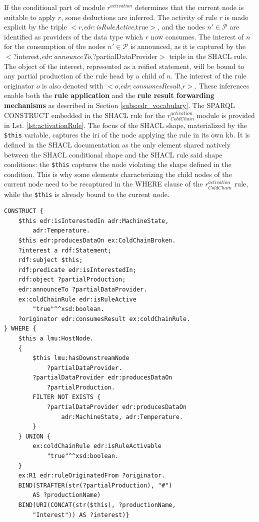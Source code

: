 \documentclass[sw]{iosart2x}
\newcommand{\namespace}[1]{\textit{#1$:$}}
\newcommand{\concept}[2]{\namespace{#1}\-\textit{#2}}
\newcommand{\triplet}[3]{$<$#1,\textit{#2},#3$>$}
\begin{document}
If the conditional part of module $r^{activation}$ determines that the current node is suitable to apply $r$, some deductions are inferred. 
The activity of rule $r$ is made explicit by the triple \triplet{$r$}{\concept{edr}{isRuleActive}}{true}, and the nodes $n'\in \mathcal{P}$ are identified as providers of the data type which $r$ now consumes. 
The interest of $n$ for the consumption of the nodes $n'\in \mathcal{P}$ is announced, as it is captured by the \triplet{?interest}{\concept{edr}{announce\-To}}{?partial\-Data\-Provider} triple in the SHACL rule.
The object of the interest, represented as a reified statement, will be bound to any partial production of the rule head by a child of $n$.
The interest of the rule originator $o$ is also denoted with \triplet{$o$}{\concept{edr}{consumes\-Result}}{$r$}.
These inferences enable both the \textbf{rule application} and the \textbf{rule result forwarding mechanisms} as described in Section \textsection \ref{subs:edr_vocabulary}.
The SPARQL CONSTRUCT embedded in the SHACL rule for the $r_{ColdChain}^{activation}$ module is provided in Lst. \ref{lst:activationRule}.
The focus of the SHACL shape, materialized by the \texttt{\$this} variable, captures the \gls{iri} of the node applying the rule in its own \gls{kb}.
It is defined in the SHACL documentation as the only element shared natively between the SHACL conditional shape and the SHACL rule said shape conditions: the \texttt{\$this} captures the node violating the shape defined in the condition. 
This is why some elements characterizing the child nodes of the current node need to be recaptured in the WHERE clause of the $r_{ColdChain}^{activation}$ rule, while the \texttt{\$this} is already bound to the current node.

\begin{lstlisting}[float, caption=$r_{ColdChain}^{activation}$ rule, label=lst:activationRule]
CONSTRUCT {
	$this edr:isInterestedIn adr:MachineState, 
		adr:Temperature.
	$this edr:producesDataOn ex:ColdChainBroken.
	?interest a rdf:Statement;
	rdf:subject $this;
	rdf:predicate edr:isInterestedIn;
	rdf:object ?partialProduction;
	edr:announceTo ?partialDataProvider.
	ex:coldChainRule edr:isRuleActive 
		"true"^^xsd:boolean.
	?originator edr:consumesResult ex:coldChainRule.
} WHERE {
	$this a lmu:HostNode.
	{
		$this lmu:hasDownstreamNode 
			?partialDataProvider.
		?partialDataProvider edr:producesDataOn 
			?partialProduction.
		FILTER NOT EXISTS {
			?partialDataProvider edr:producesDataOn
				adr:MachineState, adr:Temperature.
		}
	} UNION {
		ex:coldChainRule edr:isRuleActivable 
			"true"^^xsd:boolean.
	}
	ex:R1 edr:ruleOriginatedFrom ?originator.
	BIND(STRAFTER(str(?partialProduction), "#") 
		AS ?productionName)
	BIND(URI(CONCAT(str($this), ?productionName, 
		"Interest")) AS ?interest)}
\end{lstlisting}
\end{document}
